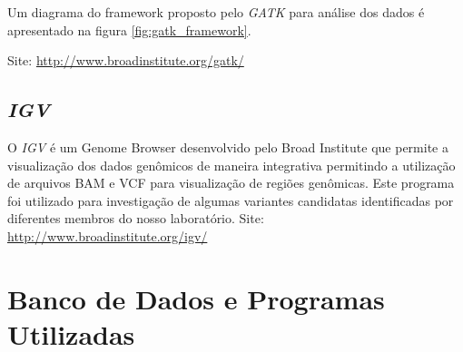 Um diagrama do framework proposto pelo \textit{GATK} para análise dos dados é apresentado na figura \ref{fig:gatk_framework}.


\noindent
Site: \url{http://www.broadinstitute.org/gatk/}

\subsection{\textit{IGV}}
O \textit{IGV} é um Genome Browser desenvolvido pelo Broad Institute que permite a visualização dos dados genômicos de maneira integrativa permitindo a utilização de arquivos BAM e VCF para visualização de regiões genômicas. Este programa foi utilizado para investigação de algumas variantes candidatas identificadas por diferentes membros do nosso laboratório.
\noindent
Site: \url{http://www.broadinstitute.org/igv/}

\section{Banco de Dados e Programas Utilizadas}

